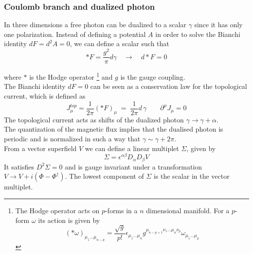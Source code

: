 \subsubsection{Coulomb branch and dualized photon	}

In three dimensions a free photon can be dualized to a scalar $\gamma$ since it has only one polarization.
Instead of defining a potential $A$ in order to solve the Bianchi identity $d F = d^2 A = 0$, we can define a scalar such that
\begin{equation}
  * F = \frac{g^2}{\pi} d  \gamma  \quad \rightarrow \quad d * F  = 0  
\end{equation} 

where 
$*$ is the Hodge operator \footnote{
  The Hodge operator acts on $p$-forms in a $n$ dimensional manifold.
  For a $p$-form $\omega$ its action is given by 
  $$
    ( * \omega)_{\mu_1 \dots \mu_{n-p}} = \frac{\sqrt{g}}{p!} \epsilon_{\mu_1 \dots \mu_n} g^{\mu_{n-p+1} \nu_1 \dots \mu_{n} \nu_p } \omega_{\mu_1 \dots \mu_p}
  $$
}
and 
$g$ is the gauge coupling.\\
The Bianchi identity $d F = 0$ can be seen as a conservation law for the topological current, which is defined as
\begin{equation}
 J_{\mu}^{top} = \frac{1}{2 \pi} ( * F)_{\mu} \; =  \; \frac{1}{2 \pi} d \, \gamma \qquad \partial^{\mu} J_{\mu} =0
\end{equation}
The topological current acts as shifts of the dualized photon $\gamma \rightarrow \gamma + \alpha$.\\
The quantization of the magnetic flux implies that the dualised photon is periodic and is normalized in such a way that $\gamma \sim \gamma + 2 \pi$.
\\
From a vector superfield $V$ we can define a linear multiplet $\Sigma$, given by
\begin{equation}
 \Sigma = \epsilon^{\alpha \beta} D_{\alpha} D_{\beta} V
 \label{eqn:linear_multiplet_gauge}
\end{equation}
It satisfies $D^2 \Sigma = 0$ and is gauge invariant under a transformation $V \rightarrow V + i (\Phi - \Phi^{\dagger})$.
The lowest component of $\Sigma$ is the scalar in the vector multiplet.
